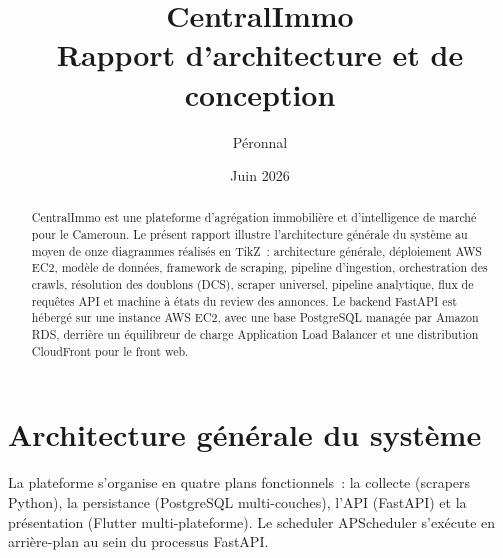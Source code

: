 \documentclass[11pt,a4paper]{report}
\title{\bfseries CentralImmo \\ \large Rapport d'architecture et de conception}
\author{P\'eronnal}
\date{Juin 2026}
\begin{document}
\maketitle
\thispagestyle{empty}

\begin{abstract}
\noindent
CentralImmo est une plateforme d'agr\'egation immobili\`ere et d'intelligence
de march\'e pour le Cameroun. Le pr\'esent rapport illustre l'architecture
g\'en\'erale du syst\`eme au moyen de onze diagrammes r\'ealis\'es en TikZ~:
architecture g\'en\'erale, d\'eploiement AWS EC2, mod\`ele de donn\'ees,
framework de scraping, pipeline d'ingestion, orchestration des crawls,
r\'esolution des doublons (DCS), scraper universel, pipeline analytique,
flux de requ\^etes API et machine \`a \'etats du review des annonces.
Le backend FastAPI est h\'eberg\'e sur une instance AWS EC2, avec une base
PostgreSQL manag\'ee par Amazon RDS, derri\`ere un \'equilibreur de charge
Application Load Balancer et une distribution CloudFront pour le front web.
\end{abstract}

\tableofcontents

\chapter{Architecture g\'en\'erale du syst\`eme}

La plateforme s'organise en quatre plans fonctionnels~: la collecte
(scrapers Python), la persistance (PostgreSQL multi-couches), l'API
(FastAPI) et la pr\'esentation (Flutter multi-plateforme). Le scheduler
APScheduler s'ex\'ecute en arri\`ere-plan au sein du processus FastAPI.
\end{document}
